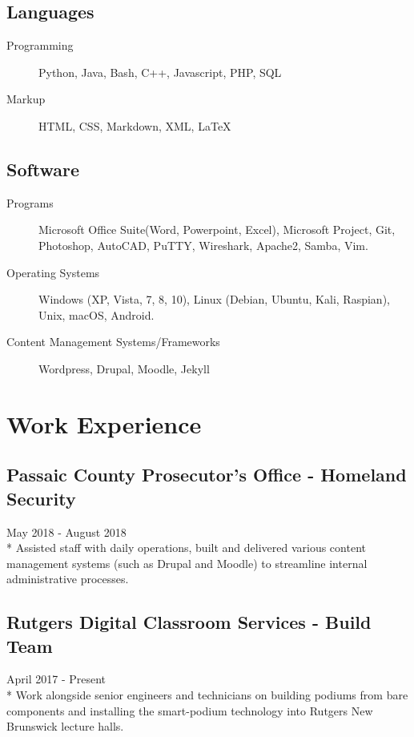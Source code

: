 \documentclass{article}
\begin{document}
\begin{multicols}{2}
\subsection{Languages}
\begin{description}
\item[Programming] Python, Java, Bash, C++, Javascript, PHP, SQL
\item[Markup] HTML, CSS, Markdown, XML, {\LaTeX}
\end{description}

\subsection{Software}

\begin{description}
\item[Programs] Microsoft Office Suite(Word, Powerpoint, Excel), Microsoft Project, Git, Photoshop, AutoCAD, PuTTY, Wireshark, Apache2, Samba, Vim.
\item[Operating Systems] Windows (XP, Vista, 7, 8, 10), Linux (Debian, Ubuntu, Kali, Raspian), Unix,  macOS, Android. 
\item[Content Management Systems/Frameworks] Wordpress, Drupal, Moodle, Jekyll
\end{description}

\section{Work Experience}

\subsection{Passaic County Prosecutor's Office - Homeland Security}
May 2018 - August 2018\\*
Assisted staff with daily operations, built and delivered various content management systems (such as  Drupal and Moodle) to streamline internal administrative processes. 

\subsection{Rutgers Digital Classroom Services - Build Team}
April 2017 - Present\\*
Work alongside senior engineers and technicians on building podiums from bare components and installing the smart-podium technology into Rutgers New Brunswick lecture halls.


\end{multicols}
\end{document}
